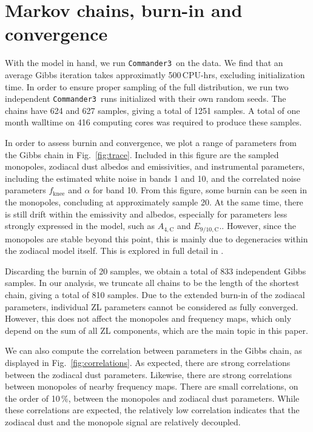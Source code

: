 \documentclass{aa}
\def\commanderthree{\texttt{Commander3}}
\begin{document}


\section{Markov chains, burn-in and convergence}
\label{sec:chains}


With the model in hand, we run \commanderthree\ on the data. We find that an average Gibbs iteration takes approximatly 500\,CPU-hrs, excluding initialization time. In order to ensure proper sampling of the full distribution, we run two independent \commanderthree\ runs initialized with their own random seeds. The chains have 624 and 627 samples, giving a total of 1251 samples. A total of one month walltime on 416 computing cores was required to produce these samples.

In order to assess burnin and convergence, we plot a range of parameters from the Gibbs chain in Fig.~\ref{fig:trace}. Included in this figure are the sampled monopoles, zodiacal dust albedos and emissivities, and instrumental parameters, including the estimated white noise in bands 1 and 10, and the correlated noise parameters $f_\mathrm{knee}$ and $\alpha$ for band 10. From this figure, some burnin can be seen in the monopoles, concluding at approximately sample 20.  At the same time, there is still drift within the emissivity and albedos, especially for parameters less strongly expressed in the model, such as $A_{4,\mathrm C}$ and $E_{9/10,\mathrm C}$.. However, since the monopoles are stable beyond this point, this is mainly due to degeneracies within the zodiacal model itself. This is explored in full detail in \citet{CG02_02}.

Discarding the burnin of 20 samples, we obtain a total of 833 independent Gibbs samples. In our analysis, we truncate all chains to be the length of the shortest chain, giving a total of 810 samples. Due to the extended burn-in of the zodiacal parameters, individual ZL parameters cannot be considered as fully converged. However, this does not affect the monopoles and frequency maps, which only depend on the sum of all ZL components, which are the main topic in this paper.

We can also compute the correlation between parameters in the Gibbs chain, as displayed in Fig.~\ref{fig:correlations}.  As expected, there are strong correlations between the zodiacal dust parameters. Likewise, there are strong correlations between monopoles of nearby frequency maps. There are small correlations, on the order of 10\,\%, between the monopoles and zodiacal dust parameters. While these correlations are expected, the relatively low correlation indicates that the zodiacal dust and the monopole signal are relatively decoupled.
\end{document}
